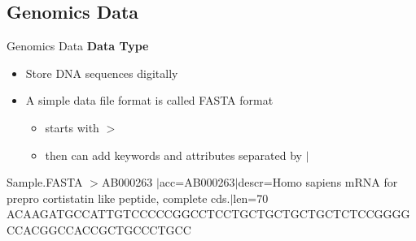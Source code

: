 \documentclass{beamer}
\begin{document}
    \subsection{Genomics Data}
    \begin{frame}{Genomics Data}
            \textbf{Data Type}
    \begin{itemize}
        \item Store DNA sequences digitally
        \item A simple data file format is called FASTA format
            \begin{itemize}
                \item starts with $>$
                \item then can add keywords and attributes separated by $|$
            \end{itemize}
    \end{itemize}
    \begin{block}{Sample.FASTA}
    $>$AB000263 $|$acc=AB000263$|$descr=Homo sapiens mRNA for prepro cortistatin like peptide, complete cds.$|$len=70
ACAAGATGCCATTGTCCCCCGGCCTCCTGCTGCTGCTGCTCTCCGGGGCCACGGCCACCGCTGCCCTGCC

    \end{block}
    \end{frame}
    
\end{document}
